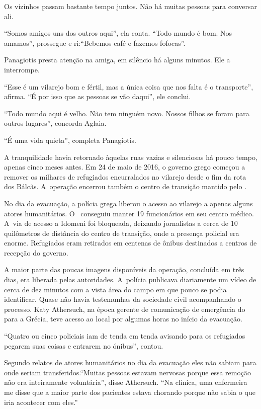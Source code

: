 Os vizinhos passam bastante tempo juntos. Não há muitas pessoas para
conversar ali.

``Somos amigos uns dos outros aqui'', ela conta. ``Todo mundo é bom. Nos
amamos'', prossegue e ri:``Bebemos café e fazemos fofocas''.

Panagiotis presta atenção na amiga, em silêncio há alguns minutos. Ele a
interrompe.

``Esse é um vilarejo bom e fértil, mas a única coisa que nos falta é o
transporte'', afirma. ``É por isso que as pessoas se vão daqui'',
ele conclui.

``Todo mundo aqui é velho. Não tem ninguém novo. Nossos filhos se foram
para outros lugares'', concorda Aglaia.

``É uma vida quieta'', completa Panagiotis.

A tranquilidade havia retornado àquelas ruas vazias e silenciosas há
pouco tempo, apenas cinco meses antes. Em 24 de maio de 2016, o governo
grego começou a remover os milhares de refugiados encurralados no
vilarejo desde o fim da rota dos Bálcãs. A~operação encerrou também o
centro de transição mantido pelo .

No dia da evacuação, a polícia grega liberou o acesso ao vilarejo a
apenas alguns atores humanitários. O~ conseguiu manter 19
funcionários em seu centro médico. A~via de acesso a Idomeni foi
bloqueada, deixando jornalistas a cerca de 10 quilômetros de distância
do centro de transição, onde a presença policial era enorme. Refugiados
eram retirados em centenas de ônibus destinados a centros de recepção do
governo.

A maior parte das poucas imagens disponíveis da operação, concluída em
três dias, era liberada pelas autoridades. A~polícia publicava
diariamente um vídeo de cerca de dez minutos com a vista área do campo
em que pouco se podia identificar. Quase não havia testemunhas da
sociedade civil acompanhando o processo. Katy Athersuch, na época gerente
de comunicação de emergência do  para a Grécia, teve acesso ao local
por algumas horas no início da evacuação.

``Quatro ou cinco policiais iam de tenda em tenda avisando para os
refugiados pegarem suas coisas e entrarem no ónibus'', contou.

Segundo relatos de atores humanitários no dia da evacuação eles não sabiam para onde seriam 
transferidos.``Muitas pessoas estavam nervosas
porque essa remoção não era inteiramente voluntária'', disse Athersuch.
``Na clínica, uma enfermeira me disse que a maior parte dos pacientes
estava chorando porque não sabia o que iria acontecer com eles.''

